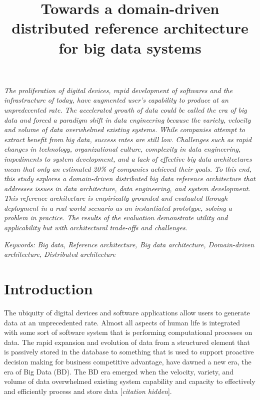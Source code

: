 \documentclass[a4paper,11pt]{article}
\title{Towards a domain-driven distributed reference architecture for big data systems}
\date{}
\let\cite\citep
\renewenvironment{abstract}
  {\quotation
  {\bfseries\noindent{\large\sffamily\abstractname}\par\nobreak\smallskip}    \noindent\itshape}
  {\endquotation}
\newcommand{\hc}{[\textit{citation hidden}]\textnormal{}}
\begin{document}
\maketitle{}
	 
\begin{abstract}
  The proliferation of digital devices, rapid development of softwares and the infrastructure of today, have augmented user's capability to produce at an unpredecented rate. The accelerated growth of data could be called the era of big data and forced a paradigm shift in data engineering because the variety, velocity and volume of data overwhelmed existing systems. While companies attempt to extract benefit from big data, success rates are still low. Challenges such as rapid changes in technology, organizational culture, complexity in data engineering, impediments to system development, and a lack of effective big data architectures mean that only an estimated 20\%{} of companies achieved their goals. To this end, this study explores a domain-driven distributed big data reference architecture that addresses issues in data architecture, data engineering, and system development. This reference architecture is empirically grounded and evaluated through deployment in a real-world scenario as an instantiated prototype, solving a problem in practice. The results of the evaluation demonstrate utility and applicability but with architectural trade-offs and challenges.
\end{abstract}


\noindent{}\emph{Keywords: Big data, Reference architecture, Big data architecture, Domain-driven architecture, Distributed architecture}


\section{Introduction}
\nobreak{}
The ubiquity of digital devices and software applications allow users to generate data at an unprecedented rate. Almost all aspects of human life is integrated with some sort of software system that is performing computational processes on data. The rapid expansion and evolution of data from a structured element that is passively stored in the database to something that is used to support proactive decision making for business
competitive advantage, have dawned a new era, the era of Big Data (BD). The BD era emerged when the velocity, variety, and volume of data overwhelmed existing system capability and capacity to effectively and efficiently process and store data 
\hc{}. 
\end{document}
